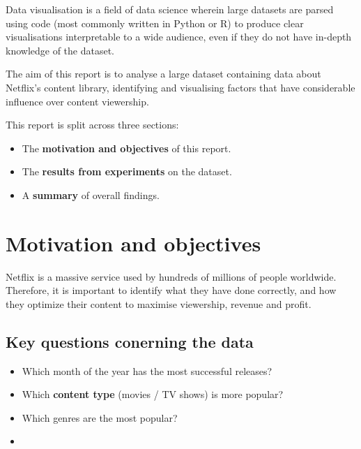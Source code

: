 \documentclass[12pt]{report}\usepackage[]{graphicx}\usepackage[]{xcolor}
\begin{document}
    Data visualisation is a field of data science wherein large datasets are parsed
    using code (most commonly written in Python or R) to produce clear visualisations
    interpretable to a wide audience, even if they do not have in-depth knowledge
    of the dataset.

    \noindent The aim of this report is to analyse a large dataset containing data about Netflix's
    content library, identifying and visualising factors that have considerable influence over content
    viewership.

    

    \noindent This report is split across three sections:
    \begin{itemize}
        \item The \textbf{motivation and objectives} of this report.
        \item The \textbf{results from experiments} on the dataset.
        \item A \textbf{summary} of overall findings.
    \end{itemize}

    \pagebreak

    \chapter{Motivation and objectives}

    
    Netflix is a massive service used by hundreds of millions of people worldwide.
    Therefore, it is important to identify what they have done correctly, and how they optimize
    their content to maximise viewership, revenue and profit.

    \section{Key questions conerning the data}
    \begin{itemize}
        \item Which month of the year has the most successful releases?
        \item Which \textbf{content type} (movies / TV shows) is more popular?
        \item Which genres are the most popular?
        \item 
    \end{itemize}
\end{document}
